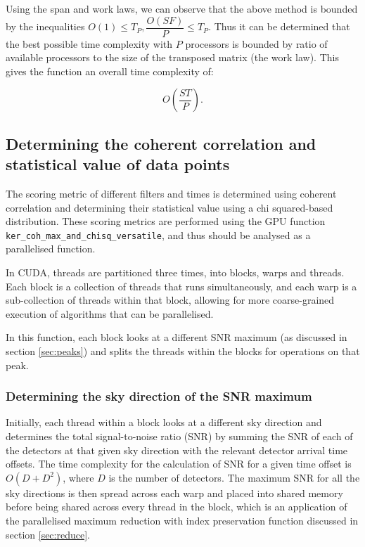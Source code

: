 \documentclass{article}
\begin{document}
Using the span and work laws, we can observe that the above method is bounded by the inequalities \(O(1) \leq T_P, \dfrac{O(SF)}{P} \leq T_P\).
Thus it can be determined that the best possible time complexity with \(P\) processors is bounded by ratio of available processors to the size of the transposed matrix (the work law).
This gives the function an overall time complexity of:

\[
    O(\dfrac{ST}{P}).
\]

\subsection{Determining the coherent correlation and statistical value of data points} \label{sec:coh_max_and_chisq_versatile}

The scoring metric of different filters and times is determined using coherent correlation and determining their statistical value using a chi squared-based distribution.
These scoring metrics are performed using the GPU function \texttt{ker\_coh\_max\_and\_chisq\_versatile}, and thus should be analysed as a parallelised function.

In CUDA, threads are partitioned three times, into blocks, warps and threads.
Each block is a collection of threads that runs simultaneously, and each warp is a sub-collection of threads within that block, allowing for more coarse-grained execution of algorithms that can be parallelised.

In this function, each block looks at a different SNR maximum (as discussed in section \ref{sec:peaks}) and splits the threads within the blocks for operations on that peak.

\subsubsection{Determining the sky direction of the SNR maximum} \label{sec:skydir}

Initially, each thread within a block looks at a different sky direction and determines the total signal-to-noise ratio (SNR) by summing the SNR of each of the detectors at that given sky direction with the relevant detector arrival time offsets.
The time complexity for the calculation of SNR for a given time offset is \(O(D + D^2)\), where \(D\) is the number of detectors.
The maximum SNR for all the sky directions is then spread across each warp and placed into shared memory before being shared across every thread in the block, which is an application of the parallelised maximum reduction with index preservation function discussed in section \ref{sec:reduce}.
\\
\end{document}

